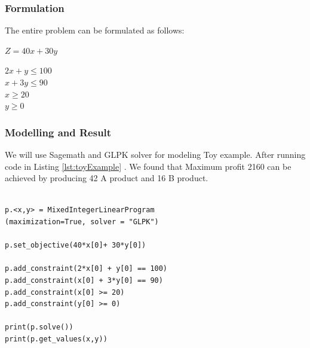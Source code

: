 \subsubsection{Formulation}
The entire problem can be formulated as follows:

\begin{center}
    $  Z = 40x + 30y $ 
\end{center}
\begin{center}
    $ 2x + y \leq 100 $ \\
    $ x + 3y \leq 90 $ \\
    $ x \geq 20 $ \\
    $ y \geq 0 \quad $
\end{center}

\subsubsection{Modelling and Result}

We will use Sagemath and GLPK solver for modeling Toy example. After running code in Listing  \ref{lst:toyExample} . We found that Maximum profit 2160 can be achieved by producing  42 A product and 16 B product.
\begin{lstlisting}[caption={Sagemath MILP modelling of toy example }, label={lst:toyExample}]

p.<x,y> = MixedIntegerLinearProgram 
(maximization=True, solver = "GLPK")

p.set_objective(40*x[0]+ 30*y[0])

p.add_constraint(2*x[0] + y[0] == 100)
p.add_constraint(x[0] + 3*y[0] == 90)
p.add_constraint(x[0] >= 20)
p.add_constraint(y[0] >= 0)

print(p.solve())
print(p.get_values(x,y))

\end{lstlisting}
